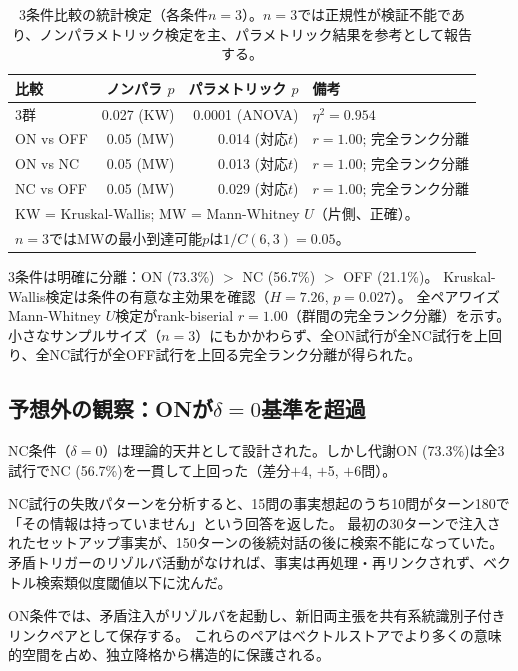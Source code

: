 \documentclass[11pt,a4paper]{article}
\begin{document}
\begin{table}[htbp]
\centering
\caption{3条件比較の統計検定（各条件$n = 3$）。$n = 3$では正規性が検証不能であり、ノンパラメトリック検定を主、パラメトリック結果を参考として報告する。}
\label{tab:statistics}
\begin{tabular}{lrrl}
\toprule
比較 & ノンパラ $p$ & パラメトリック $p$ & 備考 \\
\midrule
3群 & 0.027 (KW) & 0.0001 (ANOVA) & $\eta^2 = 0.954$ \\
ON vs OFF & 0.05 (MW) & 0.014 (対応$t$) & $r = 1.00$; 完全ランク分離 \\
ON vs NC & 0.05 (MW) & 0.013 (対応$t$) & $r = 1.00$; 完全ランク分離 \\
NC vs OFF & 0.05 (MW) & 0.029 (対応$t$) & $r = 1.00$; 完全ランク分離 \\
\bottomrule
\multicolumn{4}{l}{\footnotesize KW = Kruskal-Wallis; MW = Mann-Whitney $U$（片側、正確）。}\\
\multicolumn{4}{l}{\footnotesize $n = 3$ではMWの最小到達可能$p$は$1/C(6,3) = 0.05$。}
\end{tabular}
\end{table}

3条件は明確に分離：ON (73.3\%) $>$ NC (56.7\%) $>$ OFF (21.1\%)。
Kruskal-Wallis検定は条件の有意な主効果を確認（$H = 7.26$, $p = 0.027$）。
全ペアワイズMann-Whitney $U$検定がrank-biserial $r = 1.00$（群間の完全ランク分離）を示す。
小さなサンプルサイズ（$n = 3$）にもかかわらず、全ON試行が全NC試行を上回り、全NC試行が全OFF試行を上回る完全ランク分離が得られた。

\subsection{予想外の観察：ONが$\delta = 0$基準を超過}
\label{sec:anchoring}

NC条件（$\delta = 0$）は理論的天井として設計された。しかし代謝ON (73.3\%)は全3試行でNC (56.7\%)を一貫して上回った（差分$+$4, $+$5, $+$6問）。

NC試行の失敗パターンを分析すると、15問の事実想起のうち10問がターン180で「その情報は持っていません」という回答を返した。
最初の30ターンで注入されたセットアップ事実が、150ターンの後続対話の後に検索不能になっていた。
矛盾トリガーのリゾルバ活動がなければ、事実は再処理・再リンクされず、ベクトル検索類似度閾値以下に沈んだ。

ON条件では、矛盾注入がリゾルバを起動し、新旧両主張を共有系統識別子付きリンクペアとして保存する。
これらのペアはベクトルストアでより多くの意味的空間を占め、独立降格から構造的に保護される。
\end{document}
